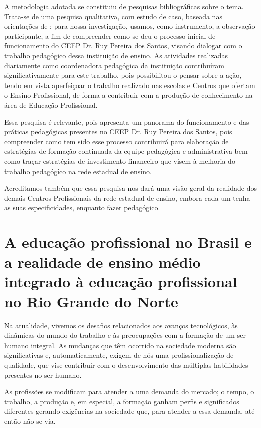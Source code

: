 \begin{refsection}
    A metodologia adotada se constituiu de pesquisas bibliográficas sobre o tema. Trata-se de uma pesquisa qualitativa, com estudo de caso, baseada nas orientações de \textcite{MINAYO2007desafio}; para nossa investigação, usamos, como instrumento, a observação participante, a fim de compreender como se deu o processo inicial de funcionamento do CEEP Dr. Ruy Pereira dos Santos, visando dialogar com o trabalho pedagógico dessa instituição de ensino. As atividades realizadas diariamente como coordenadora pedagógica da instituição contribuíram significativamente para este trabalho, pois possibilitou o pensar sobre a ação, tendo em vista aperfeiçoar o trabalho realizado nas escolas e Centros que ofertam o Ensino Profissional, de forma a contribuir com a produção de conhecimento na área de Educação Profissional.  

    Essa pesquisa é relevante, pois apresenta um panorama do funcionamento e das práticas pedagógicas presentes no CEEP Dr. Ruy Pereira dos Santos, pois compreender como tem sido esse processo contribuirá para elaboração de estratégias de formação continuada da equipe pedagógica e administrativa bem como traçar estratégias de investimento financeiro que visem à melhoria do trabalho pedagógico na rede estadual de ensino.  

    Acreditamos também que essa pesquisa nos dará uma visão geral da realidade dos demais Centros Profissionais da rede estadual de ensino, embora cada um tenha as suas especificidades, enquanto fazer pedagógico. 

    \section{A educação profissional no Brasil e a realidade de ensino médio integrado à educação profissional no Rio Grande do Norte}

    Na atualidade, vivemos os desafios relacionados aos avanços tecnológicos, às dinâmicas do mundo do trabalho e às preocupações com a formação de um ser humano integral. As mudanças que têm ocorrido na sociedade moderna são significativas e, automaticamente, exigem de nós uma profissionalização de qualidade, que vise contribuir com o desenvolvimento das múltiplas habilidades presentes no ser humano. 

    As profissões se modificam para atender a uma demanda do mercado; o tempo, o trabalho, a produção e, em especial, a formação ganham perfis e significados diferentes gerando exigências na sociedade que, para atender a essa demanda, até então não se via.  


\end{refsection}
